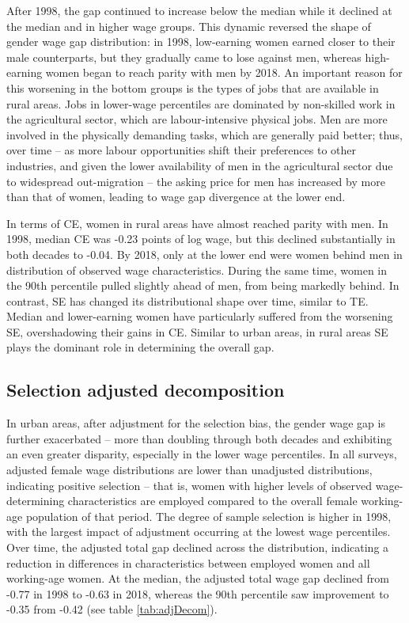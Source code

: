 After 1998, the gap continued to increase below the median while it declined at the median and in higher wage groups. This dynamic reversed the shape of gender wage gap distribution: in 1998, low-earning women earned closer to their male counterparts, but they gradually came to lose against men, whereas high-earning women began to reach parity with men by 2018. An important reason for this worsening in the bottom groups is the types of jobs that are available in rural areas. Jobs in lower-wage percentiles are dominated by non-skilled work in the agricultural sector, which are labour-intensive physical jobs. Men are more involved in the physically demanding tasks, which are generally paid better; thus, over time -- as more labour opportunities shift their preferences to other industries, and given the lower availability of men in the agricultural sector due to widespread out-migration -- the asking price for men has increased by more than that of women, leading to wage gap divergence at the lower end.\par

In terms of CE, women in rural areas have almost reached parity with men. In 1998, median CE was -0.23 points of log wage, but this declined substantially in both decades to -0.04. By 2018, only at the lower end were women behind men in distribution of observed wage characteristics. During the same time, women in the 90th percentile pulled slightly ahead of men, from being markedly behind. In contrast, SE has changed its distributional shape over time, similar to TE. Median and lower-earning women have particularly suffered from the worsening SE, overshadowing their gains in CE. Similar to urban areas, in rural areas SE plays the dominant role in determining the overall gap.\par

\subsection{Selection adjusted decomposition}

In urban areas, after adjustment for the selection bias, the gender wage gap is further exacerbated -- more than doubling through both decades and exhibiting an even greater disparity, especially in the lower wage percentiles. In all surveys, adjusted female wage distributions are lower than unadjusted distributions, indicating positive selection -- that is, women with higher levels of observed wage-determining characteristics are employed compared to the overall female working-age population of that period. The degree of sample selection is higher in 1998, with the largest impact of adjustment occurring at the lowest wage percentiles. Over time, the adjusted total gap declined across the distribution, indicating a reduction in differences in characteristics between employed women and all working-age women. At the median, the adjusted total wage gap declined from -0.77 in 1998 to -0.63 in 2018, whereas the 90th percentile saw improvement to -0.35 from -0.42 (see table \ref{tab:adjDecom}).\par 

